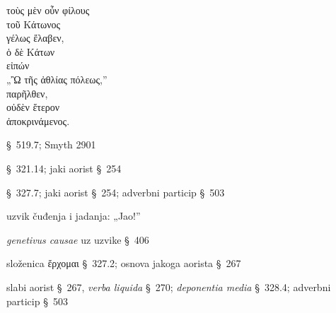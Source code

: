 \bigskip


{\large
\begin{greek}
\noindent τοὺς μὲν οὖν φίλους \\
\tabto{2em} τοῦ Κάτωνος \\
γέλως ἔλαβεν, \\
ὁ δὲ Κάτων \\
\tabto{2em} εἰπών \\
\tabto{4em} „Ὢ τῆς ἀθλίας πόλεως,”\\
παρῆλθεν, \\
οὐδὲν ἕτερον \\
\tabto{2em} ἀποκρινάμενος. \\

\end{greek}
}

\begin{description}[noitemsep]
\item[μὲν οὖν] §~519.7; Smyth 2901
\item[ἔλαβεν] §~321.14; jaki aorist §~254
\item[εἰπών] §~327.7; jaki aorist §~254; adverbni particip §~503
\item[Ὢ] uzvik čuđenja i jadanja: „Jao!''
\item[τῆς ἀθλίας πόλεως] \textit{genetivus causae} uz uzvike §~406
\item[παρῆλθεν] složenica ἔρχομαι §~327.2; osnova jakoga aorista §~267
\item[ἀποκρινάμενος] slabi aorist §~267, \textit{verba liquida} §~270; \textit{deponentia media} §~328.4; adverbni particip §~503

\end{description}


